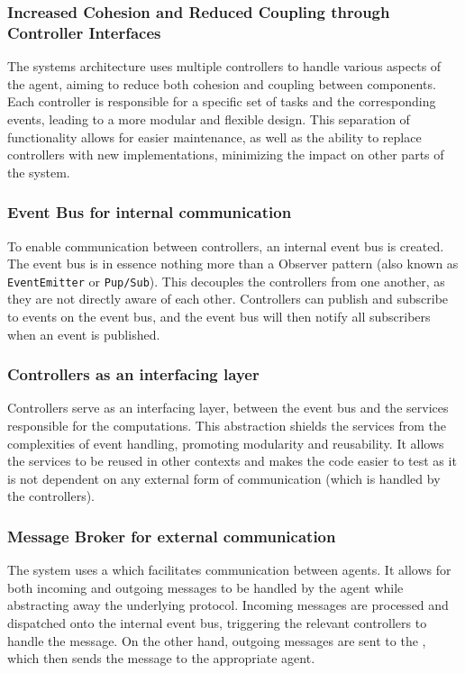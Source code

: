 \subsubsection{Increased Cohesion and Reduced Coupling through Controller Interfaces}
\label{sssec:reduced-cohesion-coupling}
The systems architecture uses multiple controllers to handle various aspects of the agent, aiming to reduce both cohesion and coupling between components. Each controller is responsible for a specific set of tasks and the corresponding events, leading to a more modular and flexible design. This separation of functionality allows for easier maintenance, as well as the ability to replace controllers with new implementations, minimizing the impact on other parts of the system.

\subsubsection{Event Bus for internal communication}
\label{sssec:event-bus}
To enable communication between controllers, an internal event bus is created. The event bus is in essence nothing more than a Observer pattern (also known as \texttt{EventEmitter} or \texttt{Pup/Sub})\cite{gamma1995design}. This decouples the controllers from one another, as they are not directly aware of each other. Controllers can publish and subscribe to events on the event bus, and the event bus will then notify all subscribers when an event is published. 

\subsubsection{Controllers as an interfacing layer}
\label{sssec:controllers-interfacing-layer}
Controllers serve as an interfacing layer, between the event bus and the services responsible for the computations. This abstraction shields the services from the complexities of event handling, promoting modularity and reusability. It allows the services to be reused in other contexts and makes the code easier to test as it is not dependent on any external form of communication (which is handled by the controllers).

\subsubsection{Message Broker for external communication}
\label{sssec:message-broker}
The system uses a  which facilitates communication between agents. It allows for both incoming and outgoing messages to be handled by the agent while abstracting away the underlying protocol. Incoming messages are processed and dispatched onto the internal event bus, triggering the relevant controllers to handle the message. On the other hand, outgoing messages are sent to the , which then sends the message to the appropriate agent.

